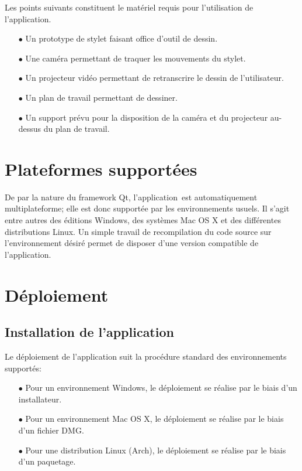\documentclass[11pt,a4paper,oldfontcommands]{memoir}
\begin{document}
Les points suivants constituent le matériel requis pour l'utilisation de l'application.

\begin{itemize}
\item[$\bullet$] Un prototype de stylet faisant office d'outil de dessin.
\item[$\bullet$] Une caméra permettant de traquer les mouvements du stylet.
\item[$\bullet$] Un projecteur vidéo permettant de retranscrire le dessin de l'utilisateur.
\item[$\bullet$] Un plan de travail permettant de dessiner.
\item[$\bullet$] Un support prévu pour la disposition de la caméra et du projecteur au-dessus du plan de travail.
\end{itemize}

\section{Plateformes supportées}

De par la nature du framework Qt, l'application est automatiquement multiplateforme; elle est donc supportée par les environnements usuels. Il s'agit entre autres des éditions Windows, des systèmes Mac OS X et des différentes distributions Linux. Un simple travail de recompilation du code source sur l'environnement désiré permet de disposer d'une version compatible de l'application.

\section{Déploiement}

\subsection{Installation de l'application}

Le déploiement de l'application suit la procédure standard des environnements supportés:

\begin{itemize}
\item[$\bullet$] Pour un environnement Windows, le déploiement se réalise par le biais d'un installateur.
\item[$\bullet$] Pour un environnement Mac OS X, le déploiement se réalise par le biais d'un fichier DMG.
\item[$\bullet$] Pour une distribution Linux (Arch), le déploiement se réalise par le biais d'un paquetage.
\end{itemize}
\end{document}
